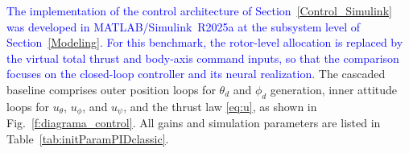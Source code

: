 \documentclass[conference]{IEEEtran}
\begin{document}
\textcolor{blue}{The implementation of the control architecture of Section~\ref{Control_Simulink} was developed in MATLAB/Simulink~R2025a at the subsystem level of Section~\ref{Modeling}. For this benchmark, the rotor-level allocation is replaced by the virtual total thrust and body-axis command inputs, so that the comparison focuses on the closed-loop controller and its neural realization. }
The cascaded baseline comprises outer position loops for $\theta_d$ and $\phi_d$ generation, inner attitude loops for $u_\theta$, $u_\phi$, and $u_\psi$, and the thrust law \eqref{eq:u}, as shown in Fig.~\ref{f:diagrama_control}. All gains and simulation parameters are listed in Table~\ref{tab:initParamPIDclassic}. %
%
\end{document}

